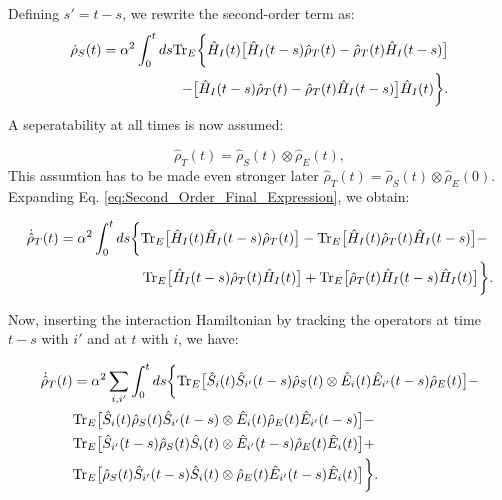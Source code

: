 Defining $s' = t - s$, we rewrite the second-order term as:
\begin{align}
    \dot{\rho}_S(t)  = \alpha^2 \int_0^t ds \mathrm{Tr}_E \bigg\{
    \hat{H}_I(t) \big[ \hat{H}_I(t-s) \hat{\rho}_T(t) - \hat{\rho}_T(t) \hat{H}_I(t-s) \big] \notag \\
    - \big[ \hat{H}_I(t-s) \hat{\rho}_T(t) - \hat{\rho}_T(t) \hat{H}_I(t-s) \big] \hat{H}_I(t)
    \bigg\}.
    \label{eq:Second_Order_Final_Expression}
\end{align}
A seperatability at all times is now assumed:

\begin{equation}
    \hat{\rho}_T(t) = \hat{\rho}_S(t) \otimes \hat{\rho}_E(t),
    \label{eq:Reduced_Density_Matrix_Assumption}
\end{equation}
This assumtion has to be made even stronger later $\hat{\rho}_T(t) = \hat{\rho}_S(t) \otimes \hat{\rho}_E(0)$.
Expanding Eq. \eqref{eq:Second_Order_Final_Expression}, we obtain:

\begin{align}
    \dot{\hat{\rho}}_T(t) & =  \alpha^2 \int_0^t ds
    \bigg\{
    \mathrm{Tr}_E \big[ \hat{H}_I(t) \hat{H}_I(t-s) \hat{\rho}_T(t) \big] -
    \mathrm{Tr}_E \big[ \hat{H}_I(t) \hat{\rho}_T(t) \hat{H}_I(t-s) \big] - \notag \\
                          & \qquad \qquad \qquad
    \mathrm{Tr}_E \big[ \hat{H}_I(t-s) \hat{\rho}_T(t) \hat{H}_I(t) \big] +
    \mathrm{Tr}_E \big[ \hat{\rho}_T(t) \hat{H}_I(t-s) \hat{H}_I(t) \big]
    \bigg\}.
    \label{eq:Expanded_Second_Order_Expression}
\end{align}

Now, inserting the interaction Hamiltonian by tracking the operators at time $t - s$ with $i'$ and at $t$ with $i$, we have:

\begin{align}
    \dot{\hat{\rho}}_T(t) & = \alpha^2  \sum_{i, i'} \int_0^t ds
    \bigg\{
    \mathrm{Tr}_E \big[ \hat{S}_i(t) \hat{S}_{i'}(t-s) \hat{\rho}_S(t)      \otimes   \hat{E}_{i}(t) \hat{E}_{i'}(t-s) \hat{\rho}_E(t)  \big] -  \notag                         \\
                          & \mathrm{Tr}_E \big[ \hat{S}_i(t) \hat{\rho}_S(t) \hat{S}_{i'}(t-s)      \otimes   \hat{E}_{i}(t) \hat{\rho}_E(t) \hat{E}_{i'}(t-s)  \big] - \notag  \\
                          & \mathrm{Tr}_E \big[ \hat{S}_{i'}(t-s) \hat{\rho}_S(t) \hat{S}_i(t)      \otimes   \hat{E}_{i'}(t-s) \hat{\rho}_E(t) \hat{E}_{i}(t)  \big] +  \notag \\
                          & \mathrm{Tr}_E \big[ \hat{\rho}_S(t) \hat{S}_{i'}(t-s) \hat{S}_i(t)      \otimes   \hat{\rho}_E(t) \hat{E}_{i'}(t-s) \hat{E}_{i}(t)  \big]
    \bigg\}.
    \label{eq:Interaction_Hamiltonian_Expansion}
\end{align}


